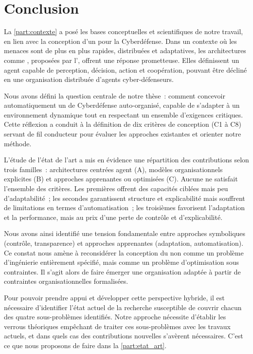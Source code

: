 \clearpage
\thispagestyle{empty}
\null
\newpage


\chapter*{Conclusion}

La \autoref{part:contexte} a posé les bases conceptuelles et scientifiques de notre travail, en lien avec la conception d'un  pour la Cyberdéfense. Dans un contexte où les menaces sont de plus en plus rapides, distribuées et adaptatives, les architectures comme , proposées par l', offrent une réponse prometteuse. Elles définissent un agent capable de perception, décision, action et coopération, pouvant être décliné en une organisation distribuée d'agents cyber-défenseurs.

Nous avons défini la question centrale de notre thèse~: comment concevoir automatiquement un  de Cyberdéfense auto-organisé, capable de s'adapter à un environnement dynamique tout en respectant un ensemble d'exigences critiques. Cette réflexion a conduit à la définition de dix critères de conception (C1 à C8) servant de fil conducteur pour évaluer les approches existantes et orienter notre méthode.

L'étude de l'état de l'art a mis en évidence une répartition des contributions selon trois familles~: architectures centrées agent (A), modèles organisationnels explicites (B) et approches apprenantes ou optimisées (C). Aucune ne satisfait l'ensemble des critères. Les premières offrent des capacités ciblées mais peu d'adaptabilité~; les secondes garantissent structure et explicabilité mais souffrent de limitations en termes d'automatisation~; les troisièmes favorisent l'adaptation et la performance, mais au prix d'une perte de contrôle et d'explicabilité.

Nous avons ainsi identifié une tension fondamentale entre approches symboliques (contrôle, transparence) et approches apprenantes (adaptation, automatisation). Ce constat nous amène à reconsidérer la conception du  non comme un problème d'ingénierie entièrement spécifié, mais comme un problème d'optimisation sous contraintes. Il s'agit alors de faire émerger une organisation adaptée à partir de contraintes organisationnelles formalisées.

Pour pouvoir prendre appui et développer cette perspective hybride, il est nécessaire d'identifier l'état actuel de la recherche susceptible de couvrir chacun des quatre sous-problèmes identifiés. Notre approche nécessite d'établir les verrous théoriques empêchant de traiter ces sous-problèmes avec les travaux actuels, et dans quels cas des contributions nouvelles s'avèrent nécessaires. C'est ce que nous proposons de faire dans la \autoref{part:etat_art}.